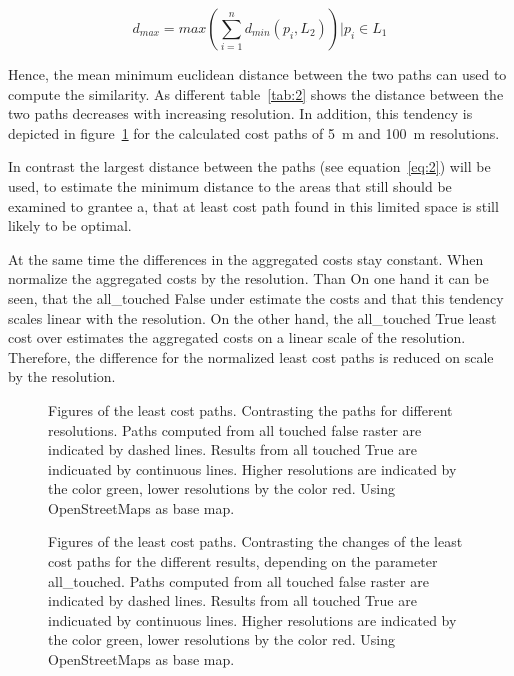 \begin{equation}
\label{eq:2}
d_{max} = max(\sum_{i=1}^{n} d_{min}(p_i, L_2)) \bigg\vert p_i \in L_1
\end{equation}

Hence, the mean minimum euclidean distance between the two paths can used to compute
the similarity.
As different table~\ref{tab:2} shows the distance between the two paths decreases
with increasing resolution.
In addition, this tendency is depicted in figure~\ref{fig:paths_resolution} for the calculated cost paths of 5~m and 100~m resolutions.

In contrast the largest distance between the paths (see equation~\ref{eq:2}) will be used, to estimate the minimum distance to the areas that still should be examined to grantee a, that at least cost path found in this limited space is still likely to be optimal.


At the same time the differences in the aggregated costs stay constant.
 When normalize the aggregated costs by the resolution.
Than On one hand it can be seen, that the all\_touched False under estimate the costs and that this tendency scales
linear with the resolution.
On the other hand, the all\_touched True least cost over estimates the aggregated costs on a linear scale of
the resolution.
Therefore, the difference for the normalized least cost paths is reduced on scale by the resolution.

\begin{figure}
	\centering

	\qquad
	\caption{Figures of the least cost paths. Contrasting the paths for different resolutions. Paths computed from all touched false raster are indicated by dashed lines. Results from all touched True are indicuated by continuous lines. Higher resolutions are indicated by the color green, lower resolutions by the color red. Using OpenStreetMaps as base map.}
	\label{fig:paths_resolution}
\end{figure}

\begin{figure}
	\centering

	\qquad

	\caption{Figures of the least cost paths. Contrasting the changes of the least cost paths for the different results, depending on the parameter all\_touched. Paths computed from all touched false raster are indicated by dashed lines. Results from all touched True are indicuated by continuous lines. Higher resolutions are indicated by the color green, lower resolutions by the color red. Using OpenStreetMaps as base map.}
	\label{fig:paths_alltouched}
\end{figure}

